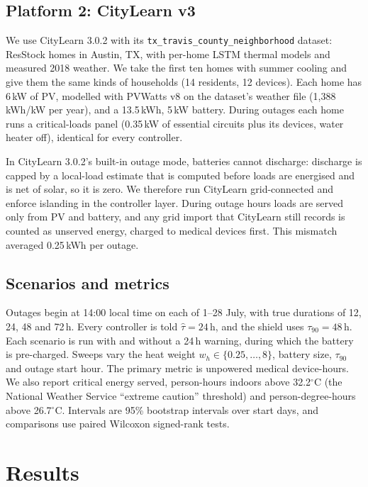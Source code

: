 \documentclass[conference]{IEEEtran}
\begin{document}
\subsection{Platform 2: CityLearn v3}
We use CityLearn 3.0.2 \cite{fonseca2026citylearnv3,nweye2025citylearn} with its \texttt{tx\_travis\_county\_neighborhood} dataset: ResStock homes in Austin, TX, with per-home LSTM thermal models and measured 2018 weather. We take the first ten homes with summer cooling and give them the same kinds of households (14 residents, 12 devices). Each home has 6\,kW of PV, modelled with PVWatts v8 \cite{dobos2014pvwatts} on the dataset's weather file (1,388\,kWh/kW per year), and a 13.5\,kWh, 5\,kW battery. During outages each home runs a critical-loads panel (0.35\,kW of essential circuits plus its devices, water heater off), identical for every controller.

In CityLearn 3.0.2's built-in outage mode, batteries cannot discharge: discharge is capped by a local-load estimate that is computed before loads are energised and is net of solar, so it is zero. We therefore run CityLearn grid-connected and enforce islanding in the controller layer. During outage hours loads are served only from PV and battery, and any grid import that CityLearn still records is counted as unserved energy, charged to medical devices first. This mismatch averaged 0.25\,kWh per outage.

\subsection{Scenarios and metrics}
Outages begin at 14:00 local time on each of 1--28 July, with true durations of 12, 24, 48 and 72\,h. Every controller is told $\hat\tau=24$\,h, and the shield uses $\tau_{90}=48$\,h. Each scenario is run with and without a 24\,h warning, during which the battery is pre-charged. Sweeps vary the heat weight $w_h\in\{0.25,\dots,8\}$, battery size, $\tau_{90}$ and outage start hour. The primary metric is unpowered medical device-hours. We also report critical energy served, person-hours indoors above 32.2$^\circ$C (the National Weather Service ``extreme caution'' threshold) and person-degree-hours above 26.7$^\circ$C. Intervals are 95\% bootstrap intervals over start days, and comparisons use paired Wilcoxon signed-rank tests.



\section{Results}
\end{document}
